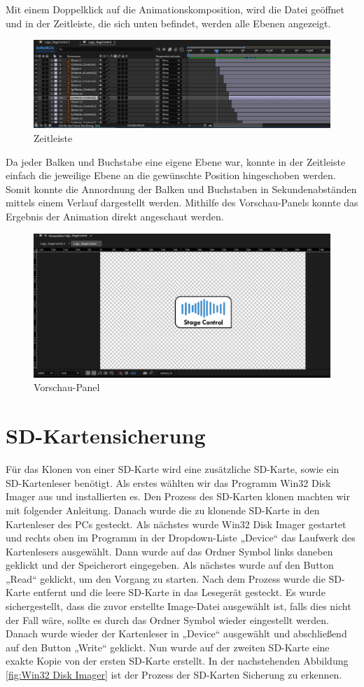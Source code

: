 Mit einem Doppelklick auf die Animationskomposition, wird die Datei geöffnet und in der Zeitleiste, die sich unten befindet, werden alle Ebenen angezeigt. 

\begin{figure}[H]
	\centering
	\includegraphics[width=0.5\linewidth]{images/Zeitleiste.png}
	\caption[Zeitleiste]{Zeitleiste}
	\label{fig:Zeitleiste}
\end{figure} 

Da jeder Balken und Buchstabe eine eigene Ebene war, konnte in der Zeitleiste einfach die jeweilige Ebene an die gewünschte Position hingeschoben werden. Somit konnte die Annordnung der Balken und Buchstaben in Sekundenabständen mittels einem Verlauf dargestellt werden. Mithilfe des Vorschau-Panels konnte das Ergebnis der Animation direkt angeschaut werden. 

\begin{figure}[H]
	\centering
	\includegraphics[width=0.5\linewidth]{images/Vorschau-Panel.png}
	\caption[Vorschau-Panel]{Vorschau-Panel}
	\label{fig:Vorschau-Panel}
\end{figure} 

\section{SD-Kartensicherung}
Für das Klonen von einer SD-Karte wird eine zusätzliche SD-Karte, sowie ein SD-Kartenleser benötigt. Als erstes wählten wir das Programm Win32 Disk Imager aus und installierten es. Den Prozess des SD-Karten klonen machten wir mit folgender Anleitung. \parencite{SD-Kartenklonen}
Danach wurde die zu klonende SD-Karte in den Kartenleser des PCs gesteckt. Als nächstes wurde Win32 Disk Imager gestartet und rechts oben im Programm in der Dropdown-Liste „Device“ das Laufwerk des Kartenlesers ausgewählt. Dann wurde auf das Ordner Symbol links daneben geklickt und der Speicherort eingegeben. Als nächstes wurde auf den Button „Read“ geklickt, um den Vorgang zu starten. Nach dem Prozess wurde die SD-Karte entfernt und die leere SD-Karte in das Lesegerät gesteckt. Es wurde sichergestellt, dass die zuvor erstellte Image-Datei ausgewählt ist, falls dies nicht der Fall wäre, sollte es durch das Ordner Symbol wieder eingestellt werden. Danach wurde wieder der Kartenleser in „Device“ ausgewählt und abschließend auf den Button „Write“ geklickt. Nun wurde auf der zweiten SD-Karte eine exakte Kopie von der ersten SD-Karte erstellt. In der nachstehenden Abbildung \ref{fig:Win32 Disk Imager} ist der Prozess der SD-Karten Sicherung zu erkennen.

